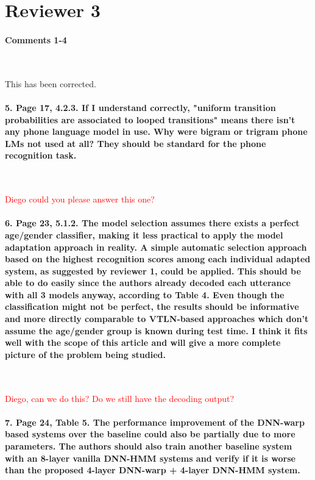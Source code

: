 \documentclass[]{article}
\begin{document}
\section{Reviewer 3}

\paragraph{Comments 1-4}

~

This has been corrected.

\paragraph{5. Page 17, 4.2.3. If I understand correctly, "uniform transition probabilities are associated to looped transitions" means there isn't any phone language model in use. Why were bigram or trigram phone LMs not used at all? They should be standard for the phone recognition task.}

~

\textcolor{red}{Diego could you please answer this one?}

\paragraph{6. Page 23, 5.1.2. The model selection assumes there exists a perfect age/gender classifier, making it less practical to apply the model adaptation approach in reality. A simple automatic selection approach based on the highest recognition scores among each individual adapted system, as suggested by reviewer 1, could be applied. This should be able to do easily since the authors already decoded each utterance with all 3 models anyway, according to Table 4. Even though the classification might not be perfect, the results should be informative and more directly comparable to VTLN-based approaches which don't assume the age/gender group is known during test time. I think it fits well with the scope of this article and will give a more complete picture of the problem being studied.}

~

\textcolor{red}{Diego, can we do this? Do we still have the decoding output?}

\paragraph{7. Page 24, Table 5. The performance improvement of the DNN-warp based systems over the baseline could also be partially due to more parameters. The authors should also train another baseline system with an 8-layer vanilla DNN-HMM systems and verify if it is worse than the proposed 4-layer DNN-warp + 4-layer DNN-HMM system.}
\end{document}

